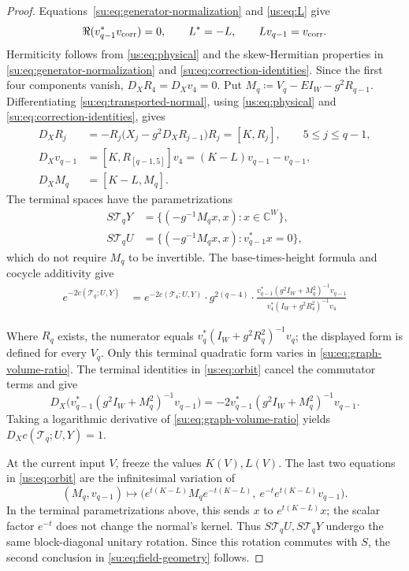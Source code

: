 \documentclass[11pt]{article}
\numberwithin{equation}{section}
\theoremstyle{remark}
\newcommand{\C}{\mathbb C}
\begin{document}
\begin{proof}
Equations~\eqref{su:eq:generator-normalization} and \eqref{us:eq:L} give
\begin{equation}\label{su:eq:correction-identities}
 \Re(v_{q-1}^*v_{\rm corr})=0,\qquad
 L^*=-L,\qquad Lv_{q-1}=v_{\rm corr}.
\end{equation}
Hermiticity follows from \eqref{us:eq:physical} and the skew-Hermitian
properties in \eqref{su:eq:generator-normalization} and
\eqref{su:eq:correction-identities}. Since the first four components vanish,
$D_XR_4=D_Xv_4=0$. Put $M_q\coloneqq V_q-EI_W-g^2R_{q-1}$.
Differentiating \eqref{su:eq:transported-normal},
using \eqref{us:eq:physical} and \eqref{su:eq:correction-identities}, gives
\begin{equation}\label{us:eq:orbit}
 \begin{aligned}
 D_XR_j&=-R_j\bigl(X_j-g^2D_XR_{j-1}\bigr)R_j
          =[K,R_j],\qquad 5\le j\le q-1,\\
 D_Xv_{q-1}&=[K,R_{[q-1,5]}]v_4=(K-L)v_{q-1}-v_{q-1},\\
 D_XM_q&=[K-L,M_q].
 \end{aligned}
\end{equation}
The terminal spaces have the parametrizations
\[
 \begin{aligned}
 S\mathcal T_qY&=\{(-g^{-1}M_qx,x):x\in\C^W\},\\
 S\mathcal T_qU&=\{(-g^{-1}M_qx,x):v_{q-1}^*x=0\},
 \end{aligned}
\]
which do not require $M_q$ to be invertible. The base-times-height
formula and cocycle additivity give
\begin{equation}\label{su:eq:graph-volume-ratio}
 \begin{aligned}
 e^{-2c(\mathcal T_q;U,Y)}
 &=e^{-2c(\mathcal T_4;U,Y)} \cdot
 g^{2(q-4)}\cdot \frac{{v_{q-1}^*(g^2I_W+M_q^2)^{-1}v_{q-1}}}
        {v_4^*(I_W+g^2R_4^2)^{-1}v_4}
 \end{aligned}
\end{equation}

Where $R_q$ exists, the numerator equals
$v_q^*(I_W+g^2R_q^2)^{-1}v_q$; the displayed form is defined for every $V_q$.
Only this terminal quadratic form varies in \eqref{su:eq:graph-volume-ratio}.
The terminal identities in \eqref{us:eq:orbit} cancel the commutator terms and give
\[
 D_X\bigl(v_{q-1}^*(g^2I_W+M_q^2)^{-1}v_{q-1}\bigr)
 =-2v_{q-1}^*(g^2I_W+M_q^2)^{-1}v_{q-1}.
\]
Taking a logarithmic derivative of \eqref{su:eq:graph-volume-ratio}
yields $D_Xc(\mathcal T_q;U,Y)=1$.

At the current input $V$, freeze the values $K(V),L(V)$.
The last two equations in \eqref{us:eq:orbit} are the infinitesimal variation of
\[
 (M_q,v_{q-1})\longmapsto
 \bigl(e^{t(K-L)}M_qe^{-t(K-L)},\ e^{-t}e^{t(K-L)}v_{q-1}\bigr).
\]
In the terminal parametrizations above, this sends
$x$ to $e^{t(K-L)}x$; the scalar factor $e^{-t}$ does not change the
normal's kernel. Thus $S\mathcal T_q U,S\mathcal T_q Y$ undergo the same block-diagonal
unitary rotation. Since this rotation commutes with $S$, the second
conclusion in \eqref{su:eq:field-geometry} follows.
\end{proof}
\end{document}

